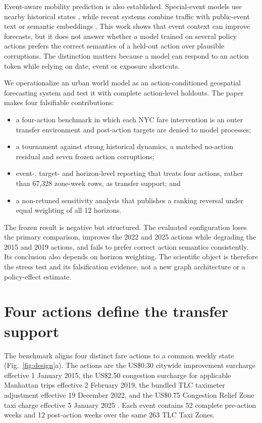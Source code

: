 \documentclass{nature}
\begin{document}
Event-aware mobility prediction is also established. Special-event models use nearby historical states \cite{yu2019specialevent}, while recent systems combine traffic with public-event text or semantic embeddings \cite{han2024eventtraffic,liang2024llmmpe,chen2025semob,yu2025fuse}. This work shows that event context can improve forecasts, but it does not answer whether a model trained on several policy actions prefers the correct semantics of a held-out action over plausible corruptions. The distinction matters because a model can respond to an action token while relying on date, event or exposure shortcuts.

We operationalize an urban world model as an action-conditioned geospatial forecasting system and test it with complete action-level holdouts. The paper makes four falsifiable contributions:
\begin{itemize}
\item a four-action benchmark in which each NYC fare intervention is an outer transfer environment and post-action targets are denied to model processes;
\item a tournament against strong historical dynamics, a matched no-action residual and seven frozen action corruptions;
\item event-, target- and horizon-level reporting that treats four actions, rather than 67,328 zone-week rows, as transfer support; and
\item a non-retuned sensitivity analysis that publishes a ranking reversal under equal weighting of all 12 horizons.
\end{itemize}

The frozen result is negative but structured. The evaluated configuration loses the primary comparison, improves the 2022 and 2025 actions while degrading the 2015 and 2019 actions, and fails to prefer correct action semantics consistently. Its conclusion also depends on horizon weighting. The scientific object is therefore the stress test and its falsification evidence, not a new graph architecture or a policy-effect estimate.

\section{Four actions define the transfer support}

The benchmark aligns four distinct fare actions to a common weekly state (Fig.~\ref{fig:design}a). The actions are the US\$0.30 citywide improvement surcharge effective 1 January 2015, the US\$2.50 congestion surcharge for applicable Manhattan trips effective 2 February 2019, the bundled TLC taximeter adjustment effective 19 December 2022, and the US\$0.75 Congestion Relief Zone taxi charge effective 5 January 2025 \cite{nys2019surcharge,tlc2022fare,mta2025crz}. Each event contains 52 complete pre-action weeks and 12 post-action weeks over the same 263 TLC Taxi Zones.
\end{document}
